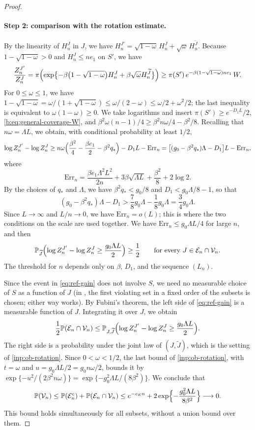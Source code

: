 \begin{proof}
\paragraph{Step 2: comparison with the rotation estimate.}
By the linearity of $H_n^J$ in $J$, we have
$H_n^{J'}=\sqrt{1-\omega}\,H_n^J+\sqrt\omega\,H_n^{\widetilde J}$. Because
$1-\sqrt{1-\omega}>0$ and $H_n^J\le ne_1$ on $S'$, we have
\[
 \frac{Z_n^{J'}}{Z_n^J}
 =\pi\Bigl(\exp\bigl\{-\beta\bigl(1-\sqrt{1-\omega}\bigr)H_n^J
    +\beta\sqrt\omega H_n^{\widetilde J}\bigr\}\Bigr)
 \ge\pi(S')\,e^{-\beta(1-\sqrt{1-\omega})ne_1}\,W .
\]
For $0\le\omega\le1$, we have
$1-\sqrt{1-\omega}=\omega/(1+\sqrt{1-\omega})\le\omega/(2-\omega)
\le\omega/2+\omega^2/2$; the last inequality is equivalent to
$\omega(1-\omega)\ge0$. We take logarithms and insert
$\pi(S')\ge e^{-D_1L}/2$, \eqref{b:eq:general-coverage-W}, and
$\beta^2\omega(n-1)/4\ge\beta^2n\omega/4-\beta^2/8$. Recalling that
$n\omega=\Lambda L$, we obtain, with conditional probability at least $1/2$,
\[
 \log Z_n^{J'}-\log Z_n^J
 \ge n\omega\Bigl(\frac{\beta^2}4-\frac{\beta e_1}2-\beta^2q_*\Bigr)
   -D_1L-\mathrm{Err}_n
 =\bigl[(g_0-\beta^2q_*)\Lambda-D_1\bigr]L-\mathrm{Err}_n,
\]
where
\[
 \mathrm{Err}_n=\frac{\beta e_1\Lambda^2L^2}{2n}+3\beta\sqrt{\Lambda L}
   +\frac{\beta^2}8+2\log2 .
\]
By the choices of $q_*$ and $\Lambda$, we have $\beta^2q_*<g_0/8$ and
$D_1<g_0\Lambda/8-1$, so that
\[
 (g_0-\beta^2q_*)\Lambda-D_1>\frac78g_0\Lambda-\frac18g_0\Lambda
 =\frac34g_0\Lambda .
\]
Since $L\to\infty$ and $L/n\to0$, we have $\mathrm{Err}_n=o(L)$; this is
where the two conditions on the scale are used together. We have
$\mathrm{Err}_n\le g_0\Lambda L/4$ for large $n$, and then
\begin{equation}\label{eq:ref-gain}
 \mathbb P_{\widetilde J}\Bigl(\log Z_n^{J'}-\log Z_n^J\ge\frac{g_0\Lambda L}2\Bigr)\ge\frac12
 \qquad\text{for every }J\in\mathcal E_n\cap\mathcal V_n .
\end{equation}
The threshold for $n$ depends only on $\beta$, $D_1$, and the sequence
$(L_n)$.

Since the event in \eqref{eq:ref-gain} does not involve $S$, we need no
measurable choice of $S$ as a function of $J$ (in
\cite[Section~6]{oai-barriers}, the first violating set in a fixed order of
the subsets is chosen; either way works). By Fubini's theorem, the left side
of \eqref{eq:ref-gain} is a measurable function of $J$. Integrating it over
$J$, we obtain
\[
 \frac12\mathbb P(\mathcal E_n\cap\mathcal V_n)
 \le\mathbb P_{J,\widetilde J}\Bigl(\log Z_n^{J'}-\log Z_n^J\ge\frac{g_0\Lambda L}2\Bigr).
\]
The right side is a probability under the joint law of $(J,\widetilde J)$, which is
the setting of \cref{inp:ob-rotation}. Since $0<\omega<1/2$, the last bound
of \cref{inp:ob-rotation}, with $t=\omega$ and $u=g_0\Lambda L/2=g_0n\omega/2$,
bounds it by $\exp\{-u^2/(2\beta^2n\omega)\}=\exp\{-g_0^2\Lambda L/(8\beta^2)\}$.
We conclude that
\[
 \mathbb P(\mathcal V_n)\le\mathbb P(\mathcal E_n^c)+\mathbb P(\mathcal E_n\cap\mathcal V_n)
 \le e^{-c_En}+2\exp\Bigl\{-\frac{g_0^2\Lambda L}{8\beta^2}\Bigr\}
 \longrightarrow0 .
\]
This bound holds simultaneously for all subsets, without a union bound over
them.


\end{proof}
